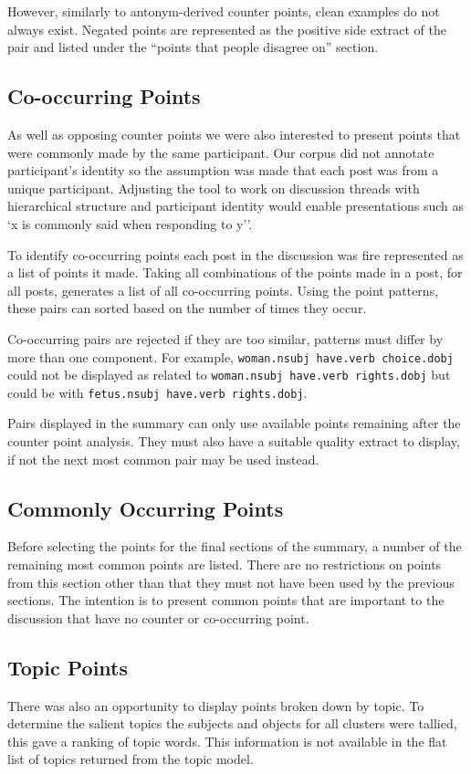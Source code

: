       However, similarly to antonym-derived counter points, clean examples do not always exist. Negated points are represented as the positive side extract of the pair and listed under the ``points that people disagree on'' section.

    \subsection{Co-occurring Points}
      As well as opposing counter points we were also interested to present points that were commonly made by the same participant. Our corpus did not annotate participant's identity so the assumption was made that each post was from a unique participant. Adjusting the tool to work on discussion threads with hierarchical structure and participant identity would enable presentations such as `x is commonly said when responding to y''.

      To identify co-occurring points each post in the discussion was fire represented as a list of points it made. Taking all combinations of the points made in a post, for all posts, generates a list of all co-occurring points. Using the point patterns, these pairs can sorted based on the number of times they occur.

      Co-occurring pairs are rejected if they are too similar, patterns must differ by more than one component. For example, \texttt{woman.nsubj have.verb choice.dobj} could not be displayed as related to \texttt{woman.nsubj have.verb rights.dobj} but could be with \texttt{fetus.nsubj have.verb rights.dobj}.

      Pairs displayed in the summary can only use available points remaining after the counter point analysis. They must also have a suitable quality extract to display, if not the next most common pair may be used instead.
    \subsection{Commonly Occurring Points}
      Before selecting the points for the final sections of the summary, a number of the remaining most common points are listed. There are no restrictions on points from this section other than that they must not have been used by the previous sections. The intention is to present common points that are important to the discussion that have no counter or co-occurring point.

    \subsection{Topic Points}
      There was also an opportunity to display points broken down by topic. To determine the salient topics the subjects and objects for all clusters were tallied, this gave a ranking of topic words. This information is not available in the flat list of topics returned from the topic model.

